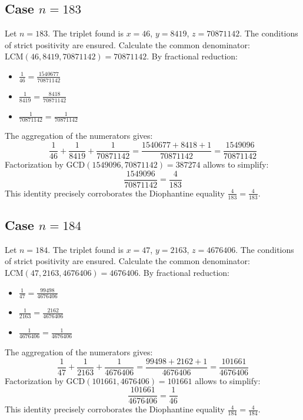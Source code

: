 \documentclass[11pt,a4paper]{article}
\begin{document}
\subsection{Case $n = 183$}
Let $n = 183$. The triplet found is $x = 46$, $y = 8419$, $z = 70871142$.
The conditions of strict positivity are ensured.
Calculate the common denominator: $\text{LCM}(46, 8419, 70871142) = 70871142$.
By fractional reduction:
\begin{itemize}
    \item $\frac{1}{46} = \frac{1540677}{70871142}$
    \item $\frac{1}{8419} = \frac{8418}{70871142}$
    \item $\frac{1}{70871142} = \frac{1}{70871142}$
\end{itemize}
The aggregation of the numerators gives:
$$ \frac{1}{46} + \frac{1}{8419} + \frac{1}{70871142} = \frac{1540677 + 8418 + 1}{70871142} = \frac{1549096}{70871142} $$
Factorization by $\text{GCD}(1549096, 70871142) = 387274$ allows to simplify:
$$ \frac{1549096}{70871142} = \frac{4}{183} $$
This identity precisely corroborates the Diophantine equality $\frac{4}{183} = \frac{4}{183}$.

\subsection{Case $n = 184$}
Let $n = 184$. The triplet found is $x = 47$, $y = 2163$, $z = 4676406$.
The conditions of strict positivity are ensured.
Calculate the common denominator: $\text{LCM}(47, 2163, 4676406) = 4676406$.
By fractional reduction:
\begin{itemize}
    \item $\frac{1}{47} = \frac{99498}{4676406}$
    \item $\frac{1}{2163} = \frac{2162}{4676406}$
    \item $\frac{1}{4676406} = \frac{1}{4676406}$
\end{itemize}
The aggregation of the numerators gives:
$$ \frac{1}{47} + \frac{1}{2163} + \frac{1}{4676406} = \frac{99498 + 2162 + 1}{4676406} = \frac{101661}{4676406} $$
Factorization by $\text{GCD}(101661, 4676406) = 101661$ allows to simplify:
$$ \frac{101661}{4676406} = \frac{1}{46} $$
This identity precisely corroborates the Diophantine equality $\frac{4}{184} = \frac{4}{184}$.
\end{document}
